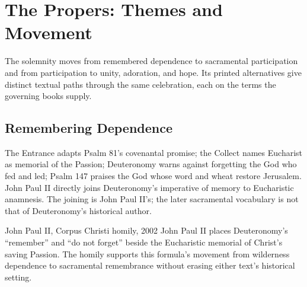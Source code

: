 \section*{The Propers: Themes and Movement}

The solemnity moves from remembered dependence to sacramental participation and from participation to unity, adoration, and hope. Its printed alternatives give distinct textual paths through the same celebration, each on the terms the governing books supply.

\begin{center}
\end{center}

\subsection*{Remembering Dependence\enspace{}}

The Entrance adapts Psalm 81's covenantal promise; the Collect names Eucharist as memorial of the Passion; Deuteronomy warns against forgetting the God who fed and led; Psalm 147 praises the God whose word and wheat restore Jerusalem. John Paul II directly joins Deuteronomy's imperative of memory to Eucharistic anamnesis. The joining is John Paul II's; the later sacramental vocabulary is not that of Deuteronomy's historical author.

\begin{sourcecard}{John Paul II, Corpus Christi homily, 2002}
John Paul II places Deuteronomy's “remember” and “do not forget” beside the Eucharistic memorial of Christ's saving Passion. The homily supports this formula's movement from wilderness dependence to sacramental remembrance without erasing either text's historical setting.
\end{sourcecard}

